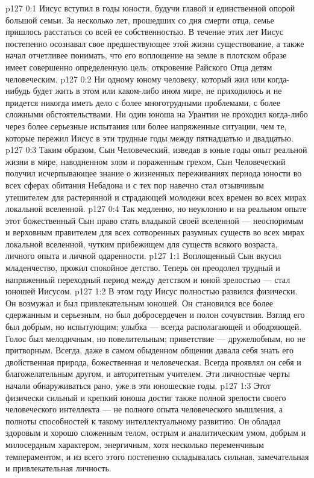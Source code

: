\author{Комиссия срединников}
\vs p127 0:1 Иисус вступил в годы юности, будучи главой и единственной опорой большой семьи. За несколько лет, прошедших со дня смерти отца, семье пришлось расстаться со всей ее собственностью. В течение этих лет Иисус постепенно осознавал свое предшествующее этой жизни существование, а также начал отчетливее понимать, что его воплощение на земле в плотском образе имеет совершенно определенную цель: откровение Райского Отца детям человеческим.
\vs p127 0:2 Ни одному юному человеку, который жил или когда\hyp{}нибудь будет жить в этом или каком\hyp{}либо ином мире, не приходилось и не придется никогда иметь дело с более многотрудными проблемами, с более сложными обстоятельствами. Ни один юноша на Урантии не проходил когда\hyp{}либо через более серьезные испытания или более напряженные ситуации, чем те, которые пережил Иисус в эти трудные годы между пятнадцатью и двадцатью.
\vs p127 0:3 Таким образом, Сын Человеческий, изведав в юные годы опыт реальной жизни в мире, наводненном злом и пораженным грехом, Сын Человеческий получил исчерпывающее знание о жизненных переживаниях периода юности во всех сферах обитания Небадона и с тех пор навечно стал отзывчивым утешителем для растерянной и страдающей молодежи всех времен во всех мирах локальной вселенной.
\vs p127 0:4 Так медленно, но неуклонно и на реальном опыте этот божественный Сын  право стать владыкой своей вселенной --- неоспоримым и верховным правителем для всех сотворенных разумных существ во всех мирах локальной вселенной, чутким прибежищем для существ всякого возраста, личного опыта и личной одаренности.
\vs p127 1:1 Воплощенный Сын вкусил младенчество, прожил спокойное детство. Теперь он преодолел трудный и напряженный переходный период между детством и юной зрелостью --- стал юношей Иисусом.
\vs p127 1:2 В этом году Иисус полностью развился физически. Он возмужал и был привлекательным юношей. Он становился все более сдержанным и серьезным, но был добросердечен и полон сочувствия. Взгляд его был добрым, но испытующим; улыбка --- всегда располагающей и ободряющей. Голос был мелодичным, но повелительным; приветствие --- дружелюбным, но не притворным. Всегда, даже в самом обыденном общении давала себя знать его двойственная природа, божественная и человеческая. Всегда проявлял он себя и благожелательным другом, и авторитетным учителем. Эти личностные черты начали обнаруживаться рано, уже в эти юношеские годы.
\vs p127 1:3 Этот физически сильный и крепкий юноша достиг также полной зрелости своего человеческого интеллекта --- не полного опыта человеческого мышления, а полноты способностей к такому интеллектуальному развитию. Он обладал здоровым и хорошо сложенным телом, острым и аналитическим умом, добрым и милосердным характером, энергичным, хотя несколько переменчивым темпераментом, и из всего этого постепенно складывалась сильная, замечательная и привлекательная личность.

